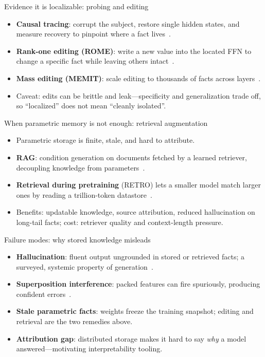 \documentclass[aspectratio=169,11pt]{beamer}
\begin{document}
\begin{frame}{Evidence it is localizable: probing and editing}
  \begin{itemize}
    \item \textbf{Causal tracing}: corrupt the subject, restore single hidden states, and
      measure recovery to pinpoint where a fact lives~\cite{meng2022rome}.
    \item \textbf{Rank-one editing (ROME)}: write a new value into the located FFN to change
      a specific fact while leaving others intact~\cite{meng2022rome}.
    \item \textbf{Mass editing (MEMIT)}: scale editing to thousands of facts across layers~\cite{meng2022memit}.
    \item Caveat: edits can be brittle and leak---specificity and generalization trade off,
      so ``localized'' does not mean ``cleanly isolated''.
  \end{itemize}
\end{frame}

\begin{frame}{When parametric memory is not enough: retrieval augmentation}
  \begin{itemize}
    \item Parametric storage is finite, stale, and hard to attribute.
    \item \textbf{RAG}: condition generation on documents fetched by a learned retriever,
      decoupling knowledge from parameters~\cite{lewis2020rag}.
    \item \textbf{Retrieval during pretraining} (RETRO) lets a smaller model match larger
      ones by reading a trillion-token datastore~\cite{borgeaud2022retro}.
    \item Benefits: updatable knowledge, source attribution, reduced hallucination on
      long-tail facts; cost: retriever quality and context-length pressure.
  \end{itemize}
\end{frame}

\begin{frame}{Failure modes: why stored knowledge misleads}
  \begin{itemize}
    \item \textbf{Hallucination}: fluent output ungrounded in stored or retrieved facts;
      a surveyed, systemic property of generation~\cite{ji2023hallucination}.
    \item \textbf{Superposition interference}: packed features can fire spuriously,
      producing confident errors~\cite{elhage2022superposition}.
    \item \textbf{Stale parametric facts}: weights freeze the training snapshot; editing
      and retrieval are the two remedies above.
    \item \textbf{Attribution gap}: distributed storage makes it hard to say \emph{why}
      a model answered---motivating interpretability tooling.
  \end{itemize}
\end{frame}
\end{document}
